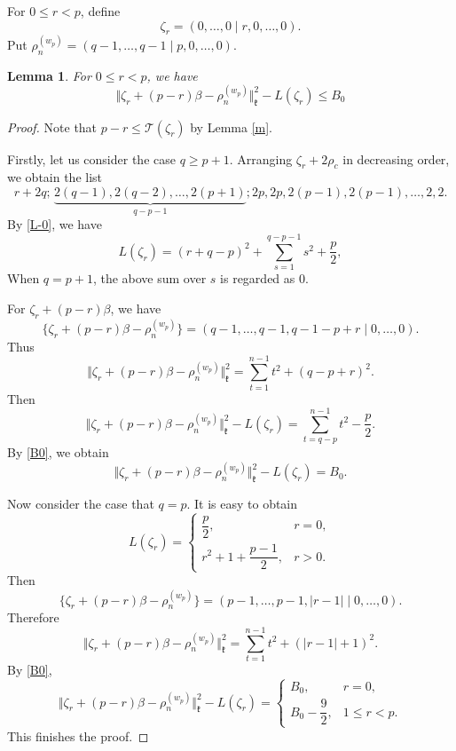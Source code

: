\documentclass[11pt]{amsart}
\theoremstyle{plain}
\newtheorem{lemma}[thm]{Lemma}
\theoremstyle{definition}
\newcommand{\frk}{\mathfrak{k}}
\newcommand{\caT}{\mathcal{T}}
\begin{document}
For $0\le r<p$, define
\[\zeta_r=(0,\dots,0\mid r,0,\dots,0).\]
Put $\rho_n^{(w_p)}=(q-1, \dots, q-1\mid p, 0, \dots, 0)$.




\begin{lemma}\label{lem1}
	For $0\le r<p$, we have
	\begin{equation}\label{weight-1}
		\Vert\zeta_r+(p-r)\beta-\rho_n^{(w_p)}\Vert_\frk^2-L(\zeta_r)\le B_0
	\end{equation}
\end{lemma}

\begin{proof}
 Note that $p-r\le \caT(\zeta_r)$ by Lemma \ref{m}.

 Firstly, let us consider the case $q\ge p+1$. Arranging $\zeta_r+2\rho_c$ in decreasing order, we obtain the list
     	\[r+2q; \,	\underbrace{2(q-1), 2(q-2), \dots, 2(p+1)}_{q-p-1} ; 2p, 2p, 2(p-1), 2(p-1), \dots, 2, 2.\]
By \eqref{L-0}, we have
\[L(\zeta_r)=(r+q-p)^2+\sum\limits_{s=1}^{q-p-1}s^2+\dfrac{p}{2},\]
	When $q=p+1$, the above sum over $s$ is regarded as $0$.
	
	For $\zeta_r+(p-r)\beta$, we have
	\begin{equation}\label{A}
	\{\zeta_r+(p-r)\beta-\rho_n^{(w_p)}\}=(q-1,\dots,q-1,q-1-p+r\mid 0,\dots,0).
\end{equation}
	Thus 	\[\Vert\zeta_r+(p-r)\beta-\rho_n^{(w_p)}\Vert_\frk^2=\sum_{t=1}^{n-1}t^2+(q-p+r)^2.\]
	Then
	\[\Vert\zeta_r+(p-r)\beta-\rho_n^{(w_p)}\Vert_\frk^2-L(\zeta_r)=\sum_{t=q-p}^{n-1}t^2-\dfrac{p}{2}.\]
	By \eqref{B0}, we obtain
	\[\Vert\zeta_r+(p-r)\beta-\rho_n^{(w_p)}\Vert_\frk^2-L(\zeta_r)=B_0.\]
	
	Now consider the case that $q=p$. It is easy to obtain
	\[L(\zeta_r)=\left\{
	\begin{array}{ll}
		\dfrac{p}{2},& r=0,\\
		r^2+1+\dfrac{p-1}{2}, & r>0.
	\end{array}
	\right.\]
	Then
	\[\{\zeta_r+(p-r)\beta-\rho_n^{(w_p)}\}=(p-1,\dots,p-1,|r-1|\mid 0,\dots,0).\]
	Therefore
	\[\Vert\zeta_r+(p-r)\beta-\rho_n^{(w_p)}\Vert_\frk^2=\sum_{t=1}^{n-1}t^2+(|r-1|+1)^2.\]
	By \eqref{B0},
	\[
	\Vert\zeta_r+(p-r)\beta-\rho_n^{(w_p)}\Vert_\frk^2-L(\zeta_r)=\left\{
	\begin{array}{ll}
		B_0, & r=0,\\
		B_0-\dfrac{9}{2}, & 1\le r<p.
	\end{array}
	\right.
	\]
	This finishes the proof.	
\end{proof}
\end{document}
